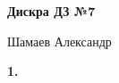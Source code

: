 \documentclass{article}
\begin{document}
\setlength{\parindent}{0pt}
\begin{Large}
    \textsf{\textbf{Дискра ДЗ №7}}
    
    Шамаев Александр    
\end{Large}
\vspace{1cm}



\textsf{\textbf{1.}}
\begin{quote}

\end{quote}
\end{document}
